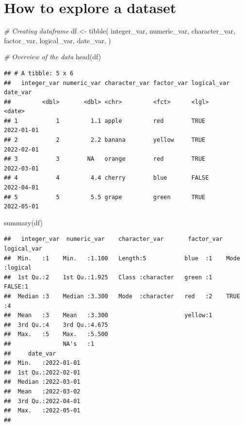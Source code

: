 \documentclass[
  12pt,
  oneside]{book}
\newenvironment{Shaded}{\begin{snugshade}}{\end{snugshade}}
\newcommand{\CommentTok}[1]{\textcolor[rgb]{0.56,0.35,0.01}{\textit{#1}}}
\newcommand{\FunctionTok}[1]{\textcolor[rgb]{0.00,0.00,0.00}{#1}}
\newcommand{\NormalTok}[1]{#1}
\newcommand{\OtherTok}[1]{\textcolor[rgb]{0.56,0.35,0.01}{#1}}
\theoremstyle{definition}
\theoremstyle{definition}
\theoremstyle{definition}
\theoremstyle{definition}
\theoremstyle{remark}
\begin{document}
\hypertarget{how-to-explore-a-dataset}{%
\section{How to explore a dataset}\label{how-to-explore-a-dataset}}

\begin{Shaded}
\begin{Highlighting}[]
\CommentTok{\# Creating dataframe}
\NormalTok{df }\OtherTok{\textless{}{-}} \FunctionTok{tibble}\NormalTok{(}
\NormalTok{  integer\_var, numeric\_var, character\_var, factor\_var, logical\_var, date\_var,}
\NormalTok{  )}

\CommentTok{\# Overview of the data}
\FunctionTok{head}\NormalTok{(df)}
\end{Highlighting}
\end{Shaded}

\begin{verbatim}
## # A tibble: 5 x 6
##   integer_var numeric_var character_var factor_var logical_var date_var  
##         <dbl>       <dbl> <chr>         <fct>      <lgl>       <date>    
## 1           1         1.1 apple         red        TRUE        2022-01-01
## 2           2         2.2 banana        yellow     TRUE        2022-02-01
## 3           3        NA   orange        red        TRUE        2022-03-01
## 4           4         4.4 cherry        blue       FALSE       2022-04-01
## 5           5         5.5 grape         green      TRUE        2022-05-01
\end{verbatim}

\begin{Shaded}
\begin{Highlighting}[]
\FunctionTok{summary}\NormalTok{(df)}
\end{Highlighting}
\end{Shaded}

\begin{verbatim}
##   integer_var  numeric_var    character_var       factor_var logical_var    
##  Min.   :1    Min.   :1.100   Length:5           blue  :1    Mode :logical  
##  1st Qu.:2    1st Qu.:1.925   Class :character   green :1    FALSE:1        
##  Median :3    Median :3.300   Mode  :character   red   :2    TRUE :4        
##  Mean   :3    Mean   :3.300                      yellow:1                   
##  3rd Qu.:4    3rd Qu.:4.675                                                 
##  Max.   :5    Max.   :5.500                                                 
##               NA's   :1                                                     
##     date_var         
##  Min.   :2022-01-01  
##  1st Qu.:2022-02-01  
##  Median :2022-03-01  
##  Mean   :2022-03-02  
##  3rd Qu.:2022-04-01  
##  Max.   :2022-05-01  
## 
\end{verbatim}
\end{document}

